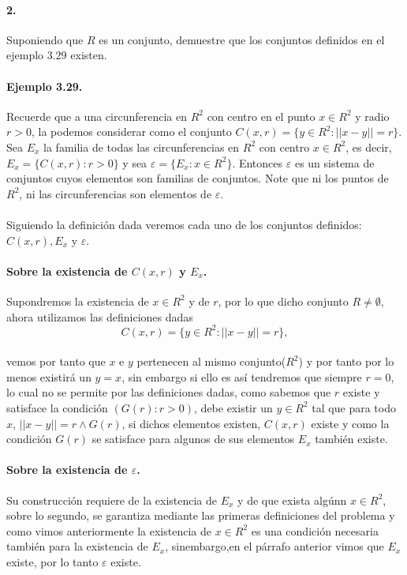 \documentclass{article}
\begin{document}
\paragraph{2.} Suponiendo que $R$ es un conjunto, demuestre que los conjuntos definidos en el ejemplo $3.29$ existen.
\paragraph{Ejemplo 3.29.} Recuerde que a una circunferencia en $R^2$ con centro en el punto $x \in R^2$ y radio $r > 0$, la podemos considerar como el conjunto $C(x,r) =\{y \in R^2: ||x - y|| = r \}$. Sea $E_x$ la familia de todas las circunferencias en $R^2$ con centro $x \in R^2$, es decir, $E_x = \{C(x,r): r > 0 \}$ y sea $\varepsilon = \{E_x: x \in R^2 \}$. Entonces $\varepsilon$ es un sistema de conjuntos cuyos elementos son familias de conjuntos. Note que ni los puntos de $R^2$, ni las circunferencias son elementos de $\varepsilon$.
\paragraph{} Siguiendo la definición dada veremos cada uno de los conjuntos definidos: $C(x,r), E_x$ y $\varepsilon$.
\paragraph{Sobre la existencia de $C(x,r)$ y $E_x$.} Supondremos la existencia de $x \in R^2$ y de $r$, por lo que dicho conjunto $R \neq \emptyset$, ahora utilizamos las definiciones dadas
$$C(x,r) = \{y \in R^2: ||x-y||=r\},$$
\paragraph{} vemos por tanto que $x$ e $y$ pertenecen al mismo conjunto($R^2$) y por tanto por lo menos existirá un $y=x$, sin embargo si ello es así tendremos que siempre $r=0$, lo cual no se permite por las definiciones dadas, como sabemos que $r$ existe y satisface la condición $(G(r):r>0)$, debe existir un $y \in R^2$ tal que para todo $x$, $||x-y|| = r \land G(r)$, si dichos elementos existen, $C(x,r)$ existe y como la condición $G(r)$ se satisface para algunos de sus elementos $E_x$ también existe.
\paragraph{Sobre la existencia de $\varepsilon$.} Su construcción requiere de la existencia de $E_x$ y de que exista algúnn $x \in R^2$, sobre lo segundo, se garantiza mediante las primeras definiciones del problema y como vimos anteriormente la existencia de $x \in R^2$ es una condición necesaria también para la existencia de $E_x$, sinembargo,en el párrafo anterior vimos que $E_x$ existe, por lo tanto $\varepsilon$ existe.
\end{document}
